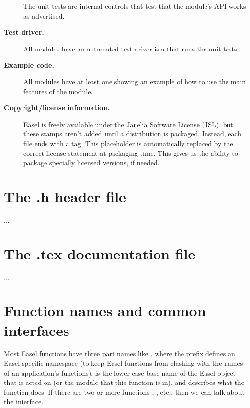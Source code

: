 \begin{description}
  The unit tests are internal controls that test that the module's API
  works as advertised.

\item [\textbf{Test driver.}]

  All modules have an automated test driver is a  that
  runs the unit tests.
 
\item [\textbf{Example code.}]

  All modules have at least one  showing an example of
  how to use the main features of the module.

\item [\textbf{Copyright/license information.}]

  Easel is freely available under the Janelia Software License (JSL),
  but these stamps aren't added until a distribution is
  packaged. Instead, each file ends with a  tag. This
  placeholder is automatically replaced by the correct license
  statement at packaging time. This gives us the ability to package
  specially licensed versions, if needed.

\end{description}


\section{The .h header file}

...

\section{The .tex documentation file}

...


\section{Function names and common interfaces}

Most Easel functions have three part names like
, where the  prefix defines an
Easel-specific namespace (to keep Easel functions from clashing with
the names of an application's functions),  is the
lower-case base name of the Easel object that is acted on (or the
module that this function is in), and  describes what
the function does.  If there are two or more functions
, , etc., then we
can talk about the  interface. 

